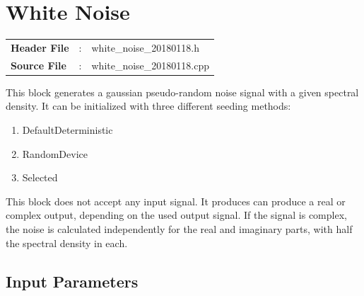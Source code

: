\clearpage

\section{White Noise}

\begin{tcolorbox}	
	\begin{tabular}{p{2.75cm} p{0.2cm} p{10.5cm}} 	
		\textbf{Header File}   &:& white\_noise\_20180118.h \\
		\textbf{Source File}   &:& white\_noise\_20180118.cpp \\
	\end{tabular}
\end{tcolorbox}

\maketitle
This block generates a gaussian pseudo-random noise signal with a given spectral density. It can be initialized with three different seeding methods:

\begin{enumerate}
	\item DefaultDeterministic
	\item RandomDevice
	\item Selected
\end{enumerate}

This block does not accept any input signal. It produces can produce a real or complex output, depending on the used output signal. If the signal is complex, the noise is calculated independently for the real and imaginary parts, with half the spectral density in each.

\subsection*{Input Parameters}


